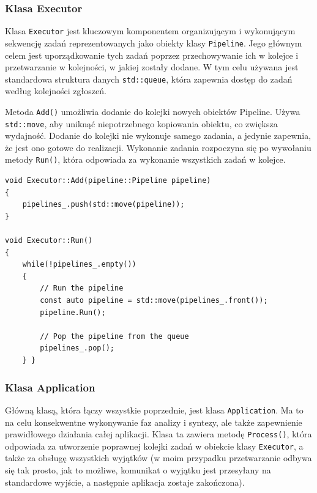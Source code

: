 \subsubsection{Klasa Executor}

Klasa \texttt{Executor} jest kluczowym komponentem organizującym i wykonującym sekwencję zadań reprezentowanych jako obiekty klasy \texttt{Pipeline}. Jego głównym celem jest uporządkowanie tych zadań poprzez przechowywanie ich w kolejce i przetwarzanie w kolejności, w jakiej zostały dodane. W tym celu używana jest standardowa struktura danych \texttt{std::queue}, która zapewnia dostęp do zadań według kolejności zgłoszeń.

Metoda \texttt{Add()} umożliwia dodanie do kolejki nowych obiektów Pipeline. Używa \texttt{std::move}, aby uniknąć niepotrzebnego kopiowania obiektu, co zwiększa wydajność. Dodanie do kolejki nie wykonuje samego zadania, a jedynie zapewnia, że jest ono gotowe do realizacji. Wykonanie zadania rozpoczyna się po wywołaniu metody \texttt{Run()}, która odpowiada za wykonanie wszystkich zadań w kolejce.

\begin{lstlisting}[label=list:executor,caption=Implementacja klasy Executor,basicstyle=\footnotesize\ttfamily]
void Executor::Add(pipeline::Pipeline pipeline)
{
	pipelines_.push(std::move(pipeline));
}

void Executor::Run()
{
	while(!pipelines_.empty())
	{
		// Run the pipeline
		const auto pipeline = std::move(pipelines_.front());
		pipeline.Run();

		// Pop the pipeline from the queue
		pipelines_.pop();
	} }
\end{lstlisting}

\subsubsection{Klasa Application}

Główną klasą, która łączy wszystkie poprzednie, jest klasa \texttt{Application}. Ma to na celu konsekwentne wykonywanie faz analizy i syntezy, ale także zapewnienie prawidłowego działania całej aplikacji. Klasa ta zawiera metodę \texttt{Process()}, która odpowiada za utworzenie poprawnej kolejki zadań w obiekcie klasy \texttt{Executor}, a także za obsługę wszystkich wyjątków (w moim przypadku przetwarzanie odbywa się tak prosto, jak to możliwe, komunikat o wyjątku jest przesyłany na standardowe wyjście, a następnie aplikacja zostaje zakończona).

